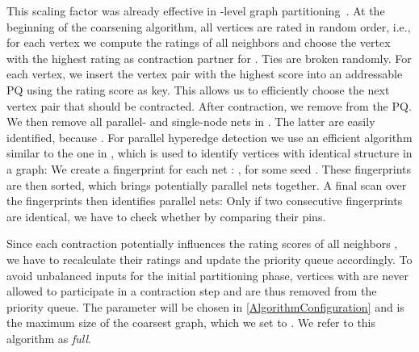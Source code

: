 \documentclass[runningheads,a4paper]{llncs}
\begin{document}
This scaling factor was already effective in -level graph partitioning~\cite{nGP}.
At the beginning of the coarsening algorithm, all vertices are rated in random order, i.e., for each vertex  we 
compute the ratings of all neighbors  and choose the vertex  with the highest rating as contraction partner for .
Ties are broken randomly. For each vertex, we insert the vertex pair with the highest score into an addressable PQ 
using the rating score as key. This allows us to efficiently choose the next vertex pair that should be contracted. After contraction, we remove 
 from the PQ. We then remove all parallel- and single-node nets in . 
The latter are easily identified, because . For parallel hyperedge detection we use an efficient algorithm similar to the one in \cite{ParallelHEDetection},
which is used to identify vertices with identical structure in a graph: 
We create a fingerprint for each net  : , for some seed . These fingerprints are then sorted, which brings potentially
parallel nets together. A final scan over the fingerprints then identifies parallel nets: Only if two consecutive fingerprints  are 
identical, we have to check whether  by comparing their pins.

Since each contraction potentially influences the rating scores of all neighbors , we have to recalculate their ratings 
and update the priority queue accordingly. To avoid unbalanced inputs for the initial partitioning phase, vertices  
with  are never allowed to participate in a contraction step and are thus removed from the priority queue.
The parameter  will be chosen in \autoref{AlgorithmConfiguration} and  is the maximum size of the coarsest graph, which we set to . 
We refer to this algorithm as \emph{full}.
\end{document}
